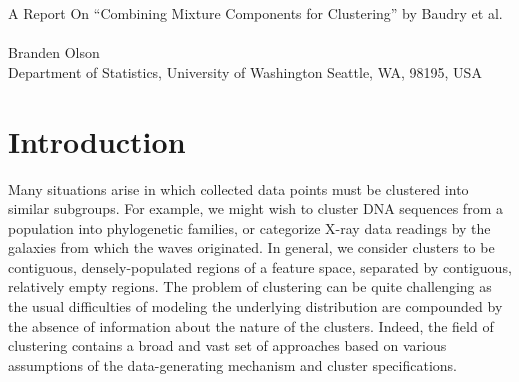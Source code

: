 \documentclass{uwstat572}
\renewcommand\;{\,}
\begin{document}

\begin{center}
  {\LARGE A Report On ``Combining Mixture Components for Clustering'' by Baudry et al.}\\\ \\
  {Branden Olson\\ 
    Department of Statistics, University of Washington Seattle, WA, 98195, USA
  }
\end{center}



\begin{abstract}
Model-based clustering typically assumes an underlying Gaussian mixture model, but often the number of mixture components is unknown. 
The familiar Bayesian information criterion, which excels at inferring the number of components, frequently overestimates the number of clusters. 
An extension known as the integrated complete likelihood criterion, which penalizes model entropy, assuages this to yield a more accurate cluster count, although falls flat for non-Gaussian cluster distributions. 
\citet{Baudry10} propose a method with combines the strengths of the two approaches, yielding a sequence of clusterings starting from the BIC solution, and iteratively merging clusters to minimize the resultant entropy.
This method is applied to simulated and real data, demonstrating superior performance in each case.
\end{abstract}

\section{Introduction}

Many situations arise in which collected data points must be clustered into similar subgroups. 
For example, we might wish to cluster DNA sequences from a population into phylogenetic families, or categorize X-ray data readings by the galaxies from which the waves originated.
In general, we consider clusters to be contiguous, densely-populated regions of a feature space, separated by contiguous, relatively empty regions.
The problem of clustering can be quite challenging as the usual difficulties of modeling the underlying distribution are compounded by the absence of information about the nature of the clusters.
Indeed, the field of clustering contains a broad and vast set of approaches based on various assumptions of the data-generating mechanism and cluster specifications.
\end{document}
